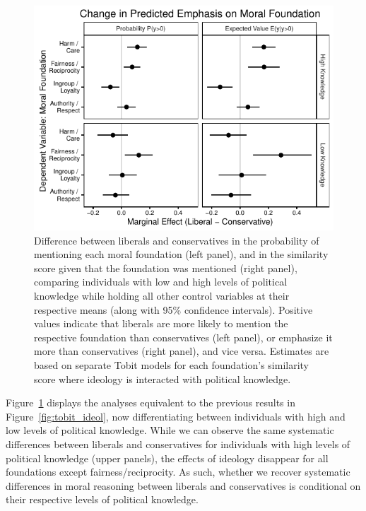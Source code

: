 \documentclass[12pt]{article}
\begin{document}
\begin{figure}[ht]\centering
\includegraphics{../calc/fig/tobit_ideol_know.pdf}
\caption{Difference between liberals and conservatives in the probability of mentioning each moral foundation (left panel), and in the similarity score given that the foundation was mentioned (right panel), comparing individuals with low and high levels of political knowledge while holding all other control variables at their respective means (along with 95\% confidence intervals). Positive values indicate that liberals are more likely to mention the respective foundation than conservatives (left panel), or emphasize it more than conservatives (right panel), and vice versa. Estimates are based on separate Tobit models for each foundation's similarity score where ideology is interacted with political knowledge.}\label{fig:tobit_ideol_know}
\end{figure}

Figure~\ref{fig:tobit_ideol_know} displays the analyses equivalent to the previous results in Figure~\ref{fig:tobit_ideol}, now differentiating between individuals with high and low levels of political knowledge. While we can observe the same systematic differences between liberals and conservatives for individuals with high levels of political knowledge (upper panels), the effects of ideology disappear for all foundations except fairness/reciprocity. As such, whether we recover systematic differences in moral reasoning between liberals and conservatives is conditional on their respective levels of political knowledge.
\end{document}
